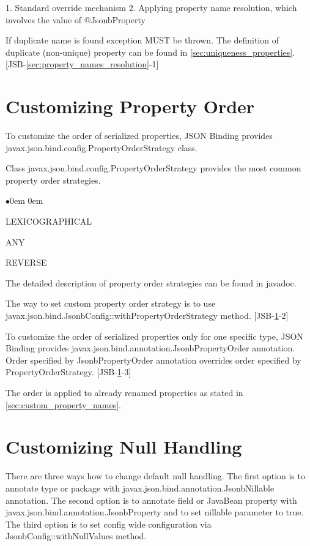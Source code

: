 1. Standard override mechanism
2. Applying property name resolution, which involves the value of @JsonbProperty

If duplicate name is found exception MUST be thrown.
The definition of duplicate (non-unique) property can be found in \ref{sec:uniqueness_properties}. [JSB-\ref{sec:property_names_resolution}-1]


\section{Customizing Property Order}
\label{sec:custom_property_order}

To customize the order of serialized properties, JSON Binding provides javax.json.bind.config.PropertyOrderStrategy class.

Class javax.json.bind.config.PropertyOrderStrategy provides the most common property order strategies.

\begin{list}{$\bullet$}{\parsep 0em  0em}
\item LEXICOGRAPHICAL
\item ANY
\item REVERSE
\end{list}

The detailed description of property order strategies can be found in javadoc.

The way to set custom property order strategy is to use javax.json.bind.JsonbConfig::withPropertyOrderStrategy method. [JSB-\ref{sec:custom_property_order}-2]

To customize the order of serialized properties only for one specific type, JSON Binding provides javax.json.bind.annotation.JsonbPropertyOrder annotation. Order specified by JsonbPropertyOrder annotation overrides order specified by PropertyOrderStrategy. [JSB-\ref{sec:custom_property_order}-3]

The order is applied to already renamed properties as stated in \ref{sec:custom_property_names}.

\section{Customizing Null Handling}
\label{sec:custom_null_handling}

There are three ways how to change default null handling. The first option is to annotate type or package with javax.json.bind.annotation.JsonbNillable annotation. The second option is to annotate field or JavaBean property with javax.json.bind.annotation.JsonbProperty and to set nillable parameter to true. The third option is to set config wide configuration via JsonbConfig::withNullValues method.


